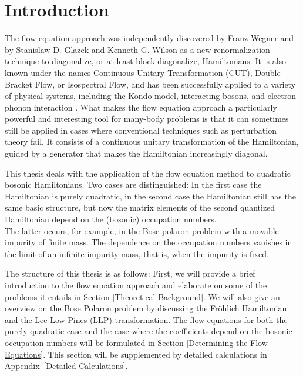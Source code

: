 \chapter{Introduction}
The flow equation approach was independently discovered by Franz Wegner \cite{https://doi.org/10.1002/andp.19945060203} and by Stanislaw D. Glazek and Kenneth G. Wilson \cite{PhysRevD.48.5863} as a new renormalization technique to diagonalize, or at least block-diagonalize, Hamiltonians. It is also known under the names Continuous Unitary Transformation (CUT), Double Bracket Flow, or Isospectral Flow, and has been successfully applied to a variety of physical systems, including the Kondo model, interacting bosons, and electron-phonon interaction \cite{Wegner_2006}. What makes the flow equation approach a particularly powerful and interesting tool for many-body problems is that it can sometimes still be applied in cases where conventional techniques such as perturbation theory fail. It consists of a continuous unitary transformation of the Hamiltonian, guided by a generator that makes the Hamiltonian increasingly diagonal. \par
This thesis deals with the application of the flow equation method to quadratic bosonic Hamiltonians. Two cases are distinguished: In the first case the Hamiltonian is purely quadratic, in the second case the Hamiltonian still has the same basic structure, but now the matrix elements of the second quantized Hamiltonian depend on the (bosonic) occupation numbers.\\
The latter occurs, for example, in the Bose polaron problem with a movable impurity of finite mass. The dependence on the occupation numbers vanishes in the limit of an infinite impurity mass, that is, when the impurity is fixed.\par
The structure of this thesis is as follows: First, we will provide a brief introduction to the flow equation approach and elaborate on some of the problems it entails in Section \ref{Theoretical Background}. We will also give an overview on the Bose Polaron problem by discussing the Fröhlich Hamiltonian and the Lee-Low-Pines (LLP) transformation. The flow equations for both the purely quadratic case and the case where the coefficients depend on the bosonic occupation numbers will be formulated in Section \ref{Determining the Flow Equations}. This section will be supplemented by detailed calculations in \mbox{Appendix \ref{Detailed Calculations}}.\\
